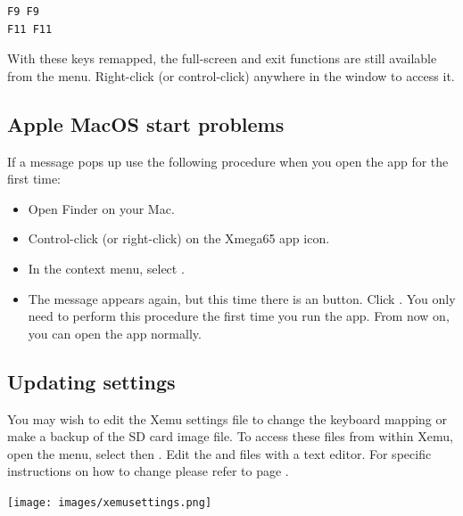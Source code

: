 \begin{tcolorbox}[colback=black,coltext=white]
\verbatimfont{\codefont}
\begin{verbatim}
F9 F9
F11 F11
\end{verbatim}
\end{tcolorbox}

With these keys remapped, the full-screen and exit functions are still available from
the menu. Right-click (or control-click) anywhere in the window to access it.

\subsection{Apple MacOS start problems}

If a message  pops up
use the following procedure when you open the app for the first time:

\begin{itemize}
  \item Open Finder on your Mac.
  \item Control-click (or right-click) on the Xmega65 app icon.
  \item In the context menu, select .
  \item The message appears again, but this time there is an  button.
        Click . You only need to perform this procedure the first time you
		run the app. From now on, you can open the app normally.
\end{itemize}

\subsection{Updating settings}
\label{sec:sdcard-settings-location}

You may wish to edit the Xemu settings file to change the keyboard mapping or make
a backup of the SD card image file. To access these files from within Xemu, open the
menu, select  then . Edit the
 and  files with a text editor.
For specific instructions on how to change  please refer to
page \pageref{sec:xemu-keyboard}.

\begin{center}
  \texttt{[image: images/xemusettings.png]}
\end{center}

